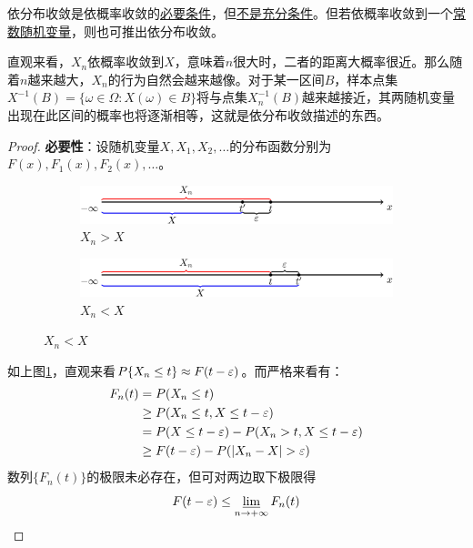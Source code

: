 \begin{proposition}
    依分布收敛是依概率收敛的\underline{必要条件}，但\underline{不是充分条件}。但若依概率收敛到一个\underline{常数随机变量}，则也可推出依分布收敛。
\end{proposition}
\begin{remark}
    直观来看，$X_n$依概率收敛到$X$，意味着$n$很大时，二者的距离大概率很近。那么随着$n$越来越大，$X_n$的行为自然会越来越像。对于某一区间$B$，样本点集$X^{-1}(B)=\{\omega\in\Omega : X(\omega) \in B\}$将与点集$X^{-1}_n(B)$越来越接近，其两随机变量出现在此区间的概率也将逐渐相等，这就是依分布收敛描述的东西。
\end{remark}
\begin{proof}
    \textbf{必要性}：设随机变量$X, X_1,  X_2, \dotsc$的分布函数分别为$F(x), F_1(x), F_2(x), \dotsc$。
    \begin{figure}[H]
        \centering
        \begin{subfigure}[]{0.8\textwidth}
            \centering
            \includegraphics[width=\textwidth]{image/CP_to_CF1.jpg}
            \caption{$X_n>X$}
            \label{fig:CP_to_CF1}
        \end{subfigure}
        \begin{subfigure}[]{0.8\textwidth}
            \centering
            \includegraphics[width=\textwidth]{image/CP_to_CF2.jpg}
            \caption{$X_n<X$}
            \label{fig:CP_to_CF2}
        \end{subfigure}
        \label{fig:CP_to_CF}
    \end{figure}
    如上图\ref{fig:CP_to_CF1}，直观来看$P\{ X_n\le t \} \approx F(t-\varepsilon)$。而严格来看有：
    \begin{align*}
        F_n(t) & = P(X_n\le t)                                     \\
               & \ge P(X_n\le t,X\le t-\varepsilon)                         \\
               & =P(X\le t-\varepsilon) - P(X_n > t,X\le t-\varepsilon)              \\
               & \ge F(t-\varepsilon) - P(\left\vert X_n-X \right\vert >\varepsilon)
    \end{align*}
    数列$\{ F_n(t) \}$的极限未必存在，但可对两边取下极限得
    \[ F(t-\varepsilon) \leq \varliminf_{n \to +\infty} F_n(t) \]


\end{proof}
